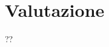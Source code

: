 \documentclass[../../docenti.tex]{subfiles}
\begin{document}
\section{Valutazione}
??
\end{document}
